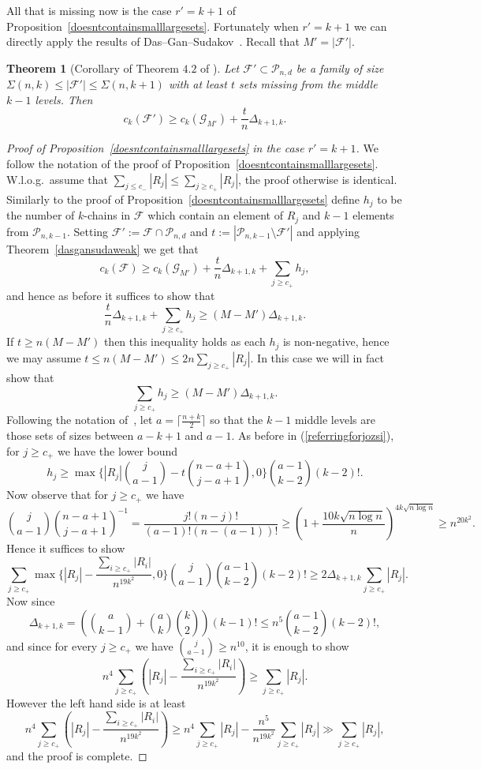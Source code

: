 \documentclass[12pt]{article}
\newtheorem{thm}[theorem]{Theorem}
\numberwithin{equation}{section}
\def\F{\mathcal{F}}
\def\G{\mathcal{G}}
\def\P{\mathcal{P}}
\begin{document}
All that is missing now is the case $r'=k+1$ of Proposition~\ref{doesntcontainsmalllargesets}.
Fortunately when $r'=k+1$ we can directly apply the results of Das--Gan--Sudakov~\cite{dasgansuda}. Recall that $M'=|\F'|$.
\begin{thm}[\label{dasgansudaweak}Corollary of Theorem $4.2$ of \cite{dasgansuda}]
Let $\F'\subset \P_{n,d}$ be a family of size $\Sigma(n,k)\leq |\F'|\leq \Sigma(n,k+1)$ with at least $t$ sets missing from the middle $k-1$ levels. Then
$$c_k(\F')\geq c_k(\G_{M'})+\frac{t}{n}\Delta_{k+1,k}.$$
\end{thm}
\begin{proof}[Proof of Proposition~\ref{doesntcontainsmalllargesets} in the case $r'=k+1$]
We follow the notation of the proof of Proposition~\ref{doesntcontainsmalllargesets}. W.l.o.g.~assume that $\sum_{j\leq c_-}|R_j|\leq \sum_{j\geq c_+}|R_j|$, the proof otherwise is identical. Similarly to the proof of Proposition~\ref{doesntcontainsmalllargesets} define $h_j$ to be the number of $k$-chains in $\F$ which contain an element of $R_j$ and $k-1$ elements from $\P_{n,k-1}$. Setting $\F':=\F\cap\P_{n,d}$ and $t:=|\P_{n,k-1}\setminus \F'|$ and applying Theorem~\ref{dasgansudaweak} we get that
$$c_k(\F)\geq c_k(\G_{M'})+\frac{t}{n}\Delta_{k+1,k}+\sum_{j\geq c_+}h_j,$$
and hence as before it suffices to show that
$$\frac{t}{n}\Delta_{k+1,k}+\sum_{j\geq c_+}h_j\geq \left(M-M'\right)\Delta_{k+1,k}.$$
If $t\geq n\left(M-M'\right)$ then this inequality holds as each $h_j$ is non-negative, hence we may assume $t\leq n\left(M-M'\right)\leq 2n\sum_{j\geq c_+}|R_j|$. In this case we will in fact show that
$$\sum_{j\geq c_+}h_j\geq \left(M-M'\right)\Delta_{k+1,k}.$$ 
Following the notation of~\cite{dasgansuda}, let $a=\lceil\frac{n+k}{2}\rceil$ so that the $k-1$ middle levels are those sets of sizes between $a-k+1$ and $a-1$. As before in (\ref{referringforjozsi}), for $j\geq c_+$ we have the lower bound
$$h_j\geq \max\bigg\{|R_j|\binom{j}{a-1}-t\binom{n-a+1}{j-a+1},0\bigg\}\binom{a-1}{k-2}(k-2)!.$$
Now observe that for $j\geq c_+$ we have
$$\binom{j}{a-1}\binom{n-a+1}{j-a+1}^{-1}=\frac{j!(n-j)!}{(a-1)!(n-(a-1))!}\geq \left(1+\frac{10k\sqrt{n\log n}}{n}\right)^{4k\sqrt{n\log n}}\geq n^{20k^2}.$$
Hence it suffices to show
$$\sum_{j\geq c_+}\max\bigg\{|R_j|-\frac{\sum_{i\geq c_+}|R_i|}{n^{19k^2}},0\bigg\}\binom{j}{a-1}\binom{a-1}{k-2}(k-2)!\geq 2\Delta_{k+1,k}\sum_{j\geq c_+}|R_j|.$$
Now since
$$\Delta_{k+1,k}=\left(\binom{a}{k-1}+\binom{a}{k}\binom{k}{2}\right)(k-1)!\leq n^5\binom{a-1}{k-2}(k-2)!,$$
and since for every $j\geq c_+$ we have $\binom{j}{a-1}\geq n^{10}$, it is enough to show
$$n^4\sum_{j\geq c_+}\left(|R_j|-\frac{\sum_{i\geq c_+}|R_i|}{n^{19k^2}}\right)\geq \sum_{j\geq c_+}|R_j|.$$
However the left hand side is at least
$$n^4\sum_{j\geq c_+}\left(|R_j|-\frac{\sum_{i\geq c_+}|R_i|}{n^{19k^2}}\right)\geq n^4\sum_{j\geq c_+}|R_j| - \frac{n^5}{n^{19k^2}}\sum_{j\geq c_+}|R_j|\gg \sum_{j\geq c_+}|R_j|,$$
and the proof is complete.
\end{proof}
\end{document}
